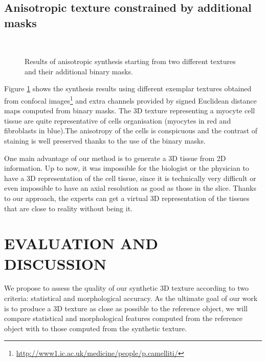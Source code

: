 \subsection{Anisotropic texture constrained by additional masks }

\begin{figure}
 \centering 
  \\
 \caption{Results of anisotropic synthesis starting from two different textures and their additional binary masks.}
 \label{fig:3DAnisotropicTextureAndMask}
\end{figure}

Figure \ref{fig:3DAnisotropicTextureAndMask} shows the synthesis results using different exemplar textures obtained from confocal images\footnote{\url{http://www1.ic.ac.uk/medicine/people/p.camelliti/}} and extra channels provided by signed Euclidean distance maps computed from  binary masks. 
The 3D texture representing a myocyte cell tissue are quite representative of cells organisation (myocytes in red and fibroblasts in blue).The anisotropy of the cells is conspicuous and the contrast of staining is well preserved thanks to the use of the binary masks. 


One main advantage of our method is to generate a 3D tissue from 2D information. 
Up to now, it was impossible for the biologist or the physician to have a 3D representation 
of the cell tissue, since it is technically very difficult or even impossible to have 
an axial resolution as good as those in the slice. 
Thanks to our approach, the experts can get a virtual 3D representation of the tissues 
that are close to reality without being it.

\section{\uppercase{Evaluation and Discussion}}
\label{sec:Evaluation}

We propose to assess the quality of our synthetic 3D texture according to two criteria: 
statistical and morphological accuracy. 
As the ultimate goal of our work is to produce a 3D texture as close as possible to the reference object, 
we will compare statistical and morphological features computed from the reference object with to those 
computed from the synthetic texture. 

